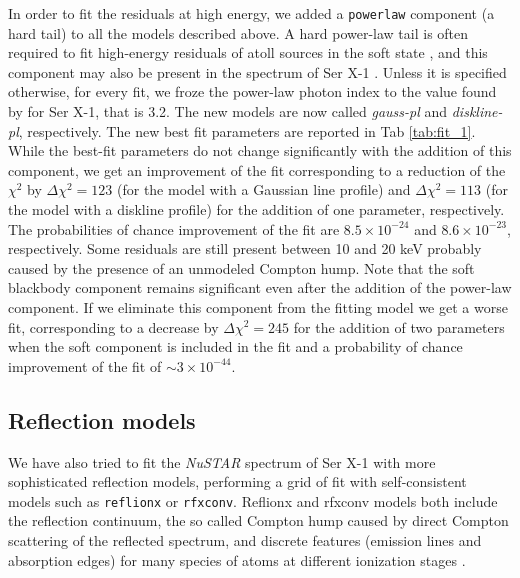 \documentclass{aa}
\begin{document}
In order to fit the residuals at high energy, we added a \texttt{powerlaw} 
component (a hard tail) to all the models described above. A hard  
power-law tail is often required to fit high-energy residuals of 
atoll sources in the soft state \citep[see e.g.][]{Pintore.etal:15, 
Pintore.etal:16, Iaria.etal:01, Iaria.etal:02}, and this component may 
also be present in the spectrum of Ser X-1 \citep[see][]{Miller.etal:13}. 
Unless it is specified otherwise, 
for every fit, we froze the power-law photon index to the value 
found by \citet{Miller.etal:13} for Ser X-1, that is 3.2. 
The new models are now called \emph{gauss-pl} and \emph{diskline-pl}, 
respectively. The new best fit parameters are reported in Tab \ref{tab:fit_1}. 
While the best-fit parameters do not change significantly with the addition
of this component, we get an improvement of the fit corresponding to a
reduction of the $\chi^2$ by $\Delta \chi^2 = 123$ (for the model with a 
Gaussian line profile) and $\Delta \chi^2 = 113$ (for the model with a 
diskline profile) for the addition of one parameter, respectively. 
The probabilities of chance improvement of the fit are $8.5 \times 10^{-24}$ 
and $8.6 \times 10^{-23}$, respectively.  Some residuals are 
still present between 10 and 20 keV probably caused by the presence of an 
unmodeled Compton hump.
Note that the soft blackbody component remains significant even after the
addition of the power-law component. If we eliminate this component 
from the fitting model we get a worse fit, corresponding to a decrease by 
$\Delta \chi^2 = 245$ for the addition of two parameters when the soft 
component is included in the fit and a probability of chance improvement
of the fit of $\sim 3 \times 10^{-44}$. 



\subsection{Reflection models}
\label{sec:refl} 
We have also tried to fit the \emph{NuSTAR} spectrum of Ser X-1 with 
more sophisticated reflection models, performing a grid of fit with 
self-consistent models such as \texttt{reflionx} or \texttt{rfxconv}.
Reflionx and rfxconv models both include the reflection continuum, the
so called Compton hump caused by direct Compton scattering of the 
reflected spectrum, and discrete features (emission lines and absorption 
edges) for many species of atoms at different ionization stages 
\citep{Ross.etal:05, Kolehmainen.etal:11}.  
\end{document}
